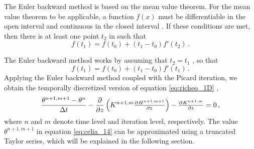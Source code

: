 The Euler backward method is based on the mean value theorem.  For the mean value theorem to be applicable, a function $f(x)$ must be differentiable in the open interval  and continuous in the closed interval  \parencite{Weisstein2017c}.  If these conditions are met, then there is at least one point $t_2$ in  such that
\begin{equation*}
  f(t_1) = f(t_0) + (t_1 - t_0) f'(t_2) \, .
\end{equation*}

The Euler backward method works by assuming that $t_2 = t_1$ \parencite{hairer_solving_2009}, so that
\begin{equation*}
  f(t_1) = f(t_0) + (t_1 - t_0) f'(t_1) \, .
\end{equation*}
Applying the Euler backward method coupled with the Picard iteration, we obtain the temporally discretized version of equation \eqref{eq:richeq_1D} \parencite{celia_general_1990}, 
\begin{equation}
  \label{eq:celia_14}
  \frac{\theta^{n+1,m+1} - \theta^n}{\Delta t} - \frac{\partial}{\partial z} \del{ K^{n+1,m}\pd{H^{n+1,m+1}}{z} } - \pd{K^{n+1,m}}{z} = 0 \, ,
\end{equation}
where $n$ and $m$ denote time level and iteration level, respectively.  The value $\theta^{n+1,m+1}$ in equation \eqref{eq:celia_14} can be approximated using a truncated Taylor series, which will be explained in the following section.


